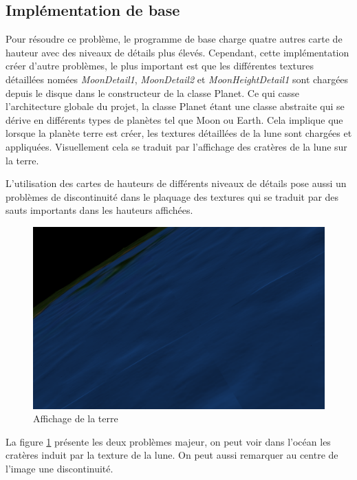     \subsection{Implémentation de base}
    Pour résoudre ce problème, le programme de base charge quatre autres carte de hauteur avec des niveaux de détails plus élevés. Cependant, cette implémentation créer d'autre problèmes, le plus important est que les différentes textures détaillées nomées \textit{MoonDetail1}, \textit{MoonDetail2} et \textit{MoonHeightDetail1} sont chargées depuis le disque dans le constructeur de la classe Planet. Ce qui casse l'architecture globale du projet, la classe Planet étant une classe abstraite qui se dérive en différents types de planètes tel que Moon ou Earth.
    Cela implique que lorsque la planète terre est créer, les textures détaillées de la lune sont chargées et appliquées.
    Visuellement cela se traduit par l'affichage des cratères de la lune sur la terre.

    L'utilisation des cartes de hauteurs de différents niveaux de détails pose aussi un problèmes de discontinuité dans le plaquage des textures qui se traduit par des sauts importants dans les hauteurs affichées.\\
     
    \begin{figure}
        \centering
        \includegraphics[width=12cm]{img/earth.png}
        \caption{Affichage de la terre}
        \label{fig:earth}
    \end{figure}
    
    
    La figure \ref{fig:earth} présente les deux problèmes majeur, on peut voir dans l'océan les cratères induit par la texture de la lune. On peut aussi remarquer au centre de l'image une discontinuité.\\
    
